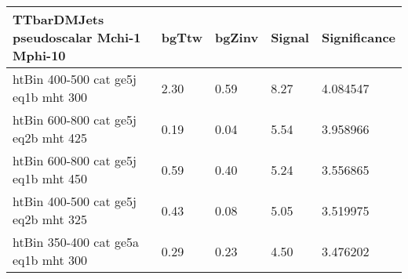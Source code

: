 \begin{tabular}{|l|l|l|l|l|}
  \small
   \label{mostSensitiveBins_TTbarDMJets_pseudoscalar_Mchi-1_Mphi-10_25ns}
	\textbf{TTbarDMJets pseudoscalar Mchi-1 Mphi-10}	 & 	bgTtw	 & 	bgZinv	 & 	Signal &	 Significance \\ 
	\hline
	htBin 400-500 cat ge5j eq1b mht 300 & 	2.30	 & 	0.59	 & 	8.27 	&4.084547 \\ 
	htBin 600-800 cat ge5j eq2b mht 425 & 	0.19	 & 	0.04	 & 	5.54 	&3.958966 \\ 
	htBin 600-800 cat ge5j eq1b mht 450 & 	0.59	 & 	0.40	 & 	5.24 	&3.556865 \\ 
	htBin 400-500 cat ge5j eq2b mht 325 & 	0.43	 & 	0.08	 & 	5.05 	&3.519975 \\ 
	htBin 350-400 cat ge5a eq1b mht 300 & 	0.29	 & 	0.23	 & 	4.50 	&3.476202 \\ 
\end{tabular}
